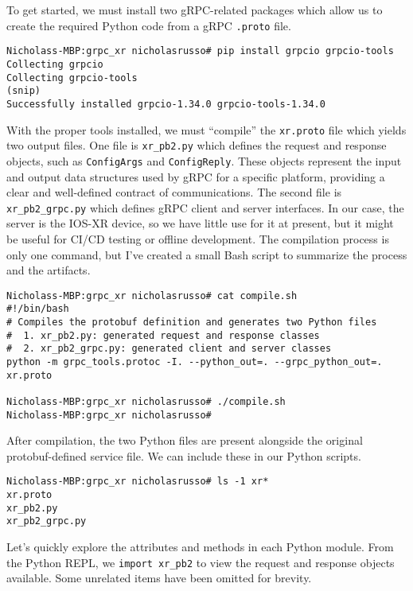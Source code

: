 To get started, we must install two gRPC-related packages which allow us
to create the required Python code from a gRPC \verb|.proto| file.

\begin{verbatim}
Nicholass-MBP:grpc_xr nicholasrusso# pip install grpcio grpcio-tools
Collecting grpcio
Collecting grpcio-tools
(snip)
Successfully installed grpcio-1.34.0 grpcio-tools-1.34.0
\end{verbatim}

With the proper tools installed, we must ``compile'' the \verb|xr.proto| file
which yields two output files. One file is \verb|xr_pb2.py| which defines
the request and response objects, such as \verb|ConfigArgs| and
\verb|ConfigReply|. These objects represent the input and output data
structures used by gRPC for a specific platform, providing a clear
and well-defined contract of communications. The second file is
\verb|xr_pb2_grpc.py| which defines gRPC client and server interfaces.
In our case, the server is the IOS-XR device, so we have little use for it
at present, but it might be useful for CI/CD testing or offline development.
The compilation process is only one command, but I've created a small Bash
script to summarize the process and the artifacts.

\begin{verbatim}
Nicholass-MBP:grpc_xr nicholasrusso# cat compile.sh
#!/bin/bash
# Compiles the protobuf definition and generates two Python files
#  1. xr_pb2.py: generated request and response classes
#  2. xr_pb2_grpc.py: generated client and server classes
python -m grpc_tools.protoc -I. --python_out=. --grpc_python_out=. xr.proto

Nicholass-MBP:grpc_xr nicholasrusso# ./compile.sh
Nicholass-MBP:grpc_xr nicholasrusso#
\end{verbatim}

After compilation, the two Python files are present alongside the original
protobuf-defined service file. We can include these in our Python scripts.

\begin{verbatim}
Nicholass-MBP:grpc_xr nicholasrusso# ls -1 xr*
xr.proto
xr_pb2.py
xr_pb2_grpc.py
\end{verbatim}

Let's quickly explore the attributes and methods in each Python module. From
the Python REPL, we \verb|import xr_pb2| to view the request and response
objects available. Some unrelated items have been omitted for brevity.

